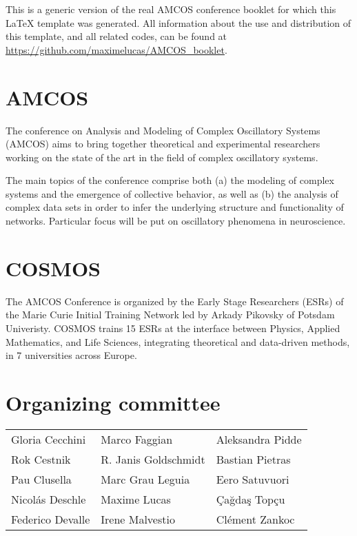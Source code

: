 {\small \textcolor{basarimblack}{This is a generic version of the real AMCOS conference booklet for which this \LaTeX{} template was generated. All information about the use and distribution of this template, and all related codes, can be found at \url{https://github.com/maximelucas/AMCOS\_booklet}.}}

\section{AMCOS}
The conference on Analysis and Modeling of Complex Oscillatory Systems (AMCOS) aims to bring together theoretical and experimental researchers working on the state of the art in the field of complex oscillatory systems.

The main topics of the conference comprise both (a) the modeling of complex systems and the emergence of collective behavior, as well as (b) the analysis of complex data sets in order to infer the underlying structure and functionality of networks. Particular focus will be put on oscillatory phenomena in neuroscience.

\section{COSMOS}

The AMCOS Conference is organized by the Early Stage Researchers (ESRs) of the Marie Curie Initial Training Network led by Arkady Pikovsky of Potsdam Univeristy. COSMOS trains 15 ESRs at the interface between Physics, Applied Mathematics, and Life Sciences, integrating theoretical and data-driven methods, in 7 universities across Europe.

\section{Organizing committee}
\begin{center}
\begin{tabular}{lll}
Gloria Cecchini & Marco Faggian &  Aleksandra Pidde \\
Rok Cestnik & R. Janis Goldschmidt &  Bastian Pietras\\
 Pau Clusella  & Marc Grau Leguia & Eero Satuvuori \\
 Nicolás Deschle & Maxime Lucas   &  Çağdaş Topçu \\
Federico Devalle  & Irene Malvestio  & Clément Zankoc 
\end{tabular}
\end{center}
